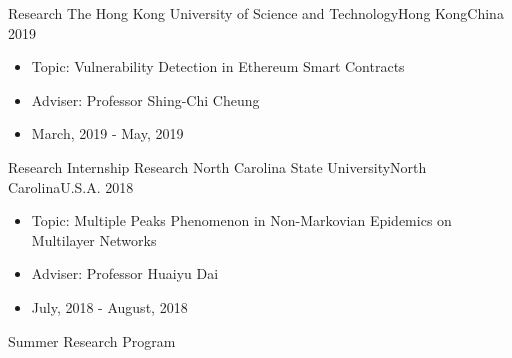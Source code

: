 %
%
%
\begin{experiences}
  \experience
  {Research} {The Hong Kong University of Science and Technology}{Hong Kong}{China}
  {2019}    {
    \begin{itemize}
      \item Topic: Vulnerability Detection in Ethereum Smart Contracts
      \item Adviser: Professor Shing-Chi Cheung
      \item March, 2019 - May, 2019
    \end{itemize}
  }
  {Research Internship}
  \emptySeparator
  \experience
  {Research}   {North Carolina State University}{North Carolina}{U.S.A.}
  {2018} {
    \begin{itemize}
      \item Topic: Multiple Peaks Phenomenon in Non-Markovian Epidemics on Multilayer Networks
      \item Adviser: Professor Huaiyu Dai
      \item July, 2018 - August, 2018
    \end{itemize}
  }
  {Summer Research Program}
\end{experiences}
